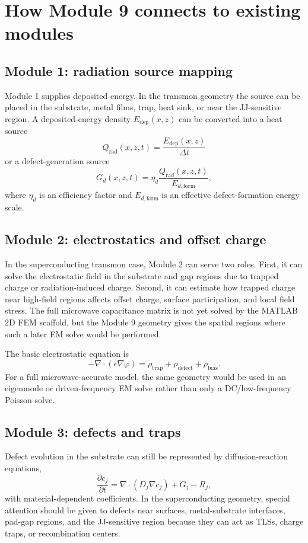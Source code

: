 \documentclass[11pt]{article}
\begin{document}
\section{How Module 9 connects to existing modules}
\subsection{Module 1: radiation source mapping}
Module 1 supplies deposited energy. In the transmon geometry the source can be placed in the substrate, metal films, trap, heat sink, or near the JJ-sensitive region. A deposited-energy density $E_{\mathrm{dep}}(x,z)$ can be converted into a heat source
\begin{equation}
    Q_{\mathrm{rad}}(x,z,t) = \frac{E_{\mathrm{dep}}(x,z)}{\Delta t}
\end{equation}
or a defect-generation source
\begin{equation}
    G_d(x,z,t)=\eta_d \frac{Q_{\mathrm{rad}}(x,z,t)}{E_{d,\mathrm{form}}},
\end{equation}
where $\eta_d$ is an efficiency factor and $E_{d,\mathrm{form}}$ is an effective defect-formation energy scale.

\subsection{Module 2: electrostatics and offset charge}
In the superconducting transmon case, Module 2 can serve two roles. First, it can solve the electrostatic field in the substrate and gap regions due to trapped charge or radiation-induced charge. Second, it can estimate how trapped charge near high-field regions affects offset charge, surface participation, and local field stress. The full microwave capacitance matrix is not yet solved by the MATLAB 2D FEM scaffold, but the Module 9 geometry gives the spatial regions where such a later EM solve would be performed.

The basic electrostatic equation is
\begin{equation}
    -\nabla\cdot(\epsilon\nabla\varphi)=\rho_{\mathrm{trap}}+\rho_{\mathrm{defect}}+\rho_{\mathrm{bias}}.
\end{equation}
For a full microwave-accurate model, the same geometry would be used in an eigenmode or driven-frequency EM solve rather than only a DC/low-frequency Poisson solve.

\subsection{Module 3: defects and traps}
Defect evolution in the substrate can still be represented by diffusion-reaction equations,
\begin{equation}
    \frac{\partial c_j}{\partial t}=\nabla\cdot(D_j\nabla c_j)+G_j-R_j,
\end{equation}
with material-dependent coefficients. In the superconducting geometry, special attention should be given to defects near surfaces, metal-substrate interfaces, pad-gap regions, and the JJ-sensitive region because they can act as TLSs, charge traps, or recombination centers.
\end{document}
